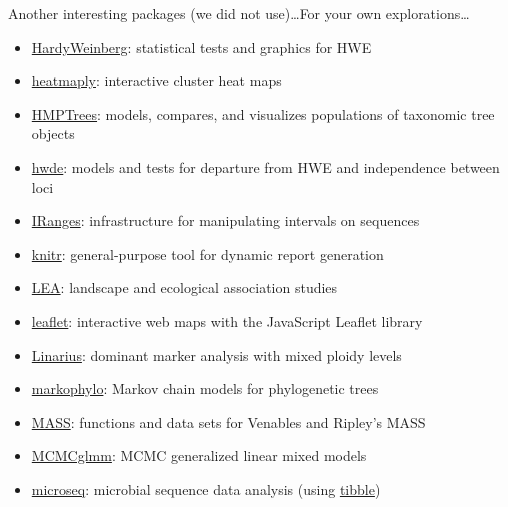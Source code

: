 \documentclass[compress, xelatex, 11pt, xcolor=svgnames, aspectratio=169,
	hyperref={
		bookmarks=true,
		unicode=true,
		colorlinks=true,
		pdftitle={Molecular data in R},
		plainpages=false,
		pdfauthor={Vojtech Zeisek},
		pdfsubject={Course about phylogeny and evolution in R},
		pdfcreator={XeLaTeX},
		pdfkeywords={R, evolution, phylogeny, molecular data},
		linkcolor=Crimson, %
		anchorcolor=Magenta, %
		citecolor=Magenta, %
		filecolor=Magenta, %
		menucolor=Magenta, %
		urlcolor=DodgerBlue, %
		},
	url={hyphens, lowtilde} %
	]{beamer}
\begin{document}
\begin{frame}[allowframebreaks]{Another interesting packages (we did not use)\ldots}{For your own explorations\ldots}
\begin{itemize}
		\item \href{https://CRAN.R-project.org/package=HardyWeinberg}{HardyWeinberg}: statistical tests and graphics for HWE
		\item \href{https://CRAN.R-project.org/package=heatmaply}{heatmaply}: interactive cluster heat maps
		\item \href{https://CRAN.R-project.org/package=HMPTrees}{HMPTrees}: models, compares, and visualizes populations of taxonomic tree objects
		\item \href{https://CRAN.R-project.org/package=hwde}{hwde}: models and tests for departure from HWE and independence between loci
		\item \href{https://bioconductor.org/packages/release/bioc/html/IRanges.html}{IRanges}: infrastructure for manipulating intervals on sequences
		\item \href{https://CRAN.R-project.org/package=knitr}{knitr}: general-purpose tool for dynamic report generation
		\item \href{https://www.bioconductor.org/packages/release/bioc/html/LEA.html}{LEA}: landscape and ecological association studies
		\item \href{https://CRAN.R-project.org/package=leaflet}{leaflet}: interactive web maps with the JavaScript Leaflet library
		\item \href{https://github.com/giby/Linarius}{Linarius}: dominant marker analysis with mixed ploidy levels
		\item \href{https://CRAN.R-project.org/package=markophylo}{markophylo}: Markov chain models for phylogenetic trees
		\item \href{https://CRAN.R-project.org/package=MASS}{MASS}: functions and data sets for Venables and Ripley's MASS
		\item \href{https://CRAN.R-project.org/package=MCMCglmm}{MCMCglmm}: MCMC generalized linear mixed models
		\item \href{https://CRAN.R-project.org/package=microseq}{microseq}: microbial sequence data analysis (using \href{https://CRAN.R-project.org/package=tibble}{tibble})

\end{itemize}
\end{frame}
\end{document}
